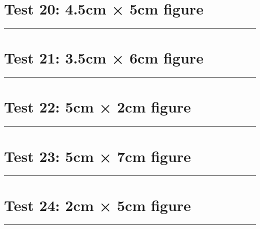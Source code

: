 \documentclass[a4paper,11pt]{article}
\begin{document}
\section*{Test 20: 4.5cm × 5cm figure}
\begin{swarmwrap}%
  \begin{minipage}[t]{4cm}
    \centering
    \rule{\linewidth}{5cm}
  \end{minipage}%
\end{swarmwrap}%
\swarmwrapnext
\lipsum[120]
\lipsum[121]
\lipsum[122]
\lipsum[123]
\section*{Test 21: 3.5cm × 6cm figure}
\begin{swarmwrap}%
  \begin{minipage}[t]{3cm}
    \centering
    \rule{\linewidth}{6cm}
  \end{minipage}%
\end{swarmwrap}%
\swarmwrapnext
\lipsum[85]
\lipsum[86]
\lipsum[87]
\lipsum[88]
\section*{Test 22: 5cm × 2cm figure}
\begin{swarmwrap}%
  \begin{minipage}[t]{5cm}
    \centering
    \rule{\linewidth}{2cm}
  \end{minipage}%
\end{swarmwrap}%
\swarmwrapnext
\lipsum[10]
\lipsum[11]
\lipsum[12]
\lipsum[13]
\section*{Test 23: 5cm × 7cm figure}
\begin{swarmwrap}%
  \begin{minipage}[t]{5cm}
    \centering
    \rule{\linewidth}{7cm}
  \end{minipage}%
\end{swarmwrap}%
\swarmwrapnext
\lipsum[70]
\lipsum[71]
\lipsum[72]
\lipsum[73]
\lipsum[74]
\lipsum[75]
\section*{Test 24: 2cm × 5cm figure}
\begin{swarmwrap}%
  \begin{minipage}[t]{2cm}
    \centering
    \rule{\linewidth}{5cm}
  \end{minipage}%
\end{swarmwrap}%
\swarmwrapnext
\lipsum[56]
\lipsum[57]
\lipsum[58]
\lipsum[59]
\lipsum[60]
\end{document}

